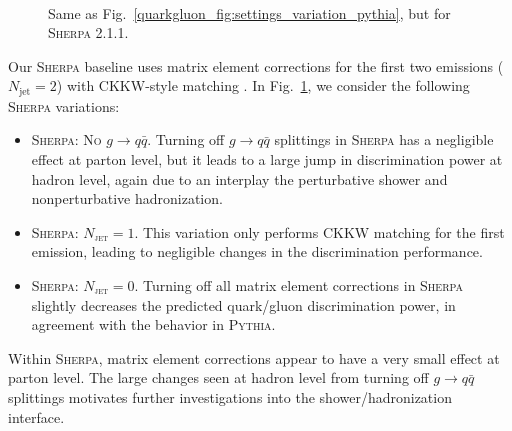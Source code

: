 \documentclass[11pt]{cernrep}
\begin{document}
\begin{figure}
\centering
{}
$\qquad$
\caption{Same as Fig.~\ref{quarkgluon_fig:settings_variation_pythia}, but for \textsc{Sherpa 2.1.1}.}
\label{quarkgluon_fig:settings_variation_sherpa}
\end{figure}

Our  \textsc{Sherpa} baseline uses matrix element corrections for the first two emissions ($N_\text{jet} = 2$) with CKKW-style matching \cite{Catani:2001cc}.  In Fig.~\ref{quarkgluon_fig:settings_variation_sherpa}, we consider the following \textsc{Sherpa} variations:
\begin{itemize}
\item \textsc{Sherpa: No $g \to q\bar{q}$}.  Turning off $g \to q \bar{q}$ splittings in \textsc{Sherpa} has a negligible effect at parton level, but it leads to a large jump in discrimination power at hadron level, again due to an interplay the perturbative shower and nonperturbative hadronization.
\item \textsc{Sherpa: $N_\text{jet} = 1$}.  This variation only performs CKKW matching for the first emission, leading to negligible changes in the discrimination performance.
\item \textsc{Sherpa: $N_\text{jet} = 0$}.  Turning off all matrix element corrections in \textsc{Sherpa} slightly decreases the predicted quark/gluon discrimination power, in agreement with the behavior in \textsc{Pythia}.
\end{itemize}
Within \textsc{Sherpa}, matrix element corrections appear to have a very small effect at parton level.  The large changes seen at hadron level from turning off $g \to q \bar{q}$ splittings motivates further investigations into the shower/hadronization interface.
\end{document}
